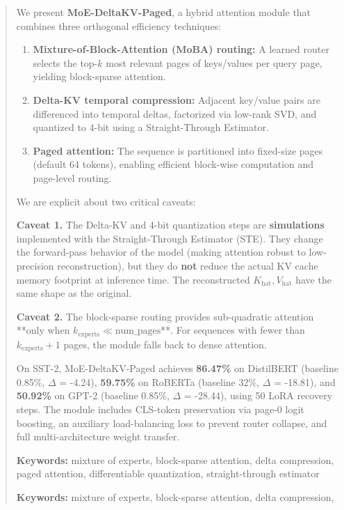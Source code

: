 \documentclass[10pt,twocolumn,letterpaper]{article}
\begin{document}
\maketitle

\begin{abstract}
We present \textbf{MoE-DeltaKV-Paged}, a hybrid attention module that combines 
three orthogonal efficiency techniques:

\begin{enumerate}
\item \textbf{Mixture-of-Block-Attention (MoBA) routing:} A learned router selects
  the top-$k$ most relevant pages of keys/values per query page, yielding
  block-sparse attention.
\item \textbf{Delta-KV temporal compression:} Adjacent key/value pairs are differenced
  into temporal deltas, factorized via low-rank SVD, and quantized to
  4-bit using a Straight-Through Estimator.
\item \textbf{Paged attention:} The sequence is partitioned into fixed-size pages
  (default 64 tokens), enabling efficient block-wise computation and
  page-level routing.

\end{enumerate}
We are explicit about two critical caveats:

\textbf{Caveat 1.} The Delta-KV and 4-bit quantization steps are \textbf{simulations} 
implemented with the Straight-Through Estimator (STE). They change the 
forward-pass behavior of the model (making attention robust to low-precision 
reconstruction), but they do \textbf{not} reduce the actual KV cache memory 
footprint at inference time. The reconstructed $K_\text{hat}, V_\text{hat}$ 
have the same shape as the original.

\textbf{Caveat 2.} The block-sparse routing provides sub-quadratic attention **only 
when $k_\text{experts} \ll \text{num\_pages}$**. For sequences with fewer than 
$k_\text{experts} + 1$ pages, the module falls back to dense attention.

On SST-2, MoE-DeltaKV-Paged achieves \textbf{86.47\%} on DistilBERT 
(baseline 0.85\%, $\Delta$ = -4.24), \textbf{59.75\%} on RoBERTa (baseline 
32\%, $\Delta$ = -18.81), and \textbf{50.92\%} on GPT-2 (baseline 
0.85\%, $\Delta$ = -28.44), using 50 LoRA recovery steps. 
The module includes CLS-token preservation via page-0 logit boosting, an 
auxiliary load-balancing loss to prevent router collapse, and full multi-architecture weight transfer.

\textbf{Keywords:} mixture of experts, block-sparse attention, delta compression, 
paged attention, differentiable quantization, straight-through estimator



\vspace{0.5em}
\noindent\textbf{Keywords:} mixture of experts, block-sparse attention, delta compression,
\end{abstract}
\end{document}
